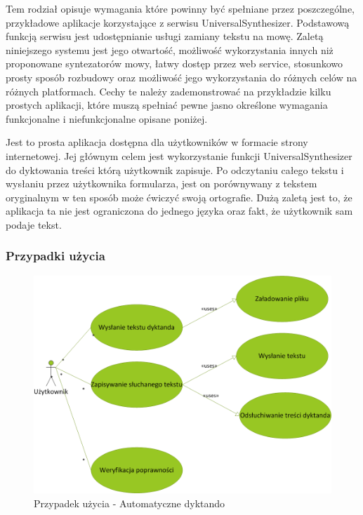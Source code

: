Tem rodział opisuje wymagania które powinny być spełniane przez poszczególne, przykładowe aplikacje korzystające z serwisu UniversalSynthesizer. Podstawową funkcją serwisu jest udostępnianie usługi zamiany tekstu na mowę. Zaletą niniejszego systemu jest jego otwartość, możliwość wykorzystania innych niż proponowane syntezatorów mowy, łatwy dostęp przez web service, stosunkowo prosty sposób rozbudowy oraz możliwość jego wykorzystania do różnych celów na różnych platformach. Cechy te należy zademonstrować na przykładzie kilku prostych aplikacji, które muszą spełniać pewne jasno określone wymagania funkcjonalne i niefunkcjonalne opisane poniżej. 


Jest to prosta aplikacja dostępna dla użytkowników w formacie strony internetowej. Jej głównym celem jest wykorzystanie funkcji UniversalSynthesizer do dyktowania treści którą użytkownik zapisuje. Po odczytaniu całego tekstu i wysłaniu przez użytkownika formularza, jest on porównywany z tekstem oryginalnym w ten sposób może ćwiczyć swoją ortografie. Dużą zaletą jest to, że aplikacja ta nie jest ograniczona do jednego języka oraz fakt, że użytkownik sam podaje tekst.
\newpage
\subsubsection{Przypadki użycia} 
\begin{figure}[!h]
	\centering
	\includegraphics[scale=0.45]{useCaseDictando.png} 
	\caption{Przypadek użycia - Automatyczne dyktando }
\end{figure}

